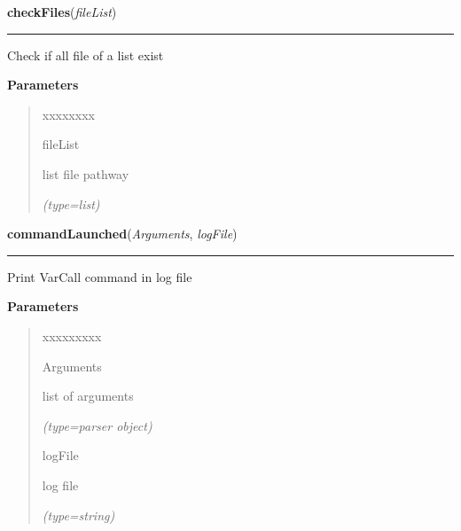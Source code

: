 \hspace{.8\funcindent}\begin{boxedminipage}{\funcwidth}

    \raggedright \textbf{checkFiles}(\textit{fileList})

    \vspace{-1.5ex}

    \rule{\textwidth}{0.5\fboxrule}
\setlength{\parskip}{2ex}
    Check if all file of a list exist

\setlength{\parskip}{1ex}
      \textbf{Parameters}
      \vspace{-1ex}

      \begin{quote}
        \begin{Ventry}{xxxxxxxx}

          \item[fileList]

          list file pathway

            {\it (type=list)}

        \end{Ventry}

      \end{quote}

    \end{boxedminipage}

    \label{script-iVARCall2:commandLaunched}

    \vspace{0.5ex}

\hspace{.8\funcindent}\begin{boxedminipage}{\funcwidth}

    \raggedright \textbf{commandLaunched}(\textit{Arguments}, \textit{logFile})

    \vspace{-1.5ex}

    \rule{\textwidth}{0.5\fboxrule}
\setlength{\parskip}{2ex}
    Print VarCall command in log file

\setlength{\parskip}{1ex}
      \textbf{Parameters}
      \vspace{-1ex}

      \begin{quote}
        \begin{Ventry}{xxxxxxxxx}

          \item[Arguments]

          list of arguments

            {\it (type=parser object)}

          \item[logFile]

          log file

            {\it (type=string)}

        \end{Ventry}

      \end{quote}

    \end{boxedminipage}

